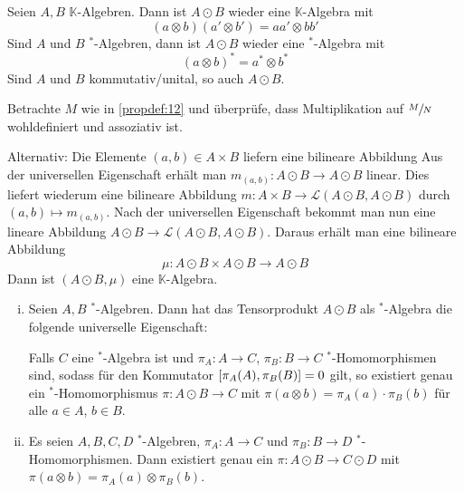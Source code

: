 \begin{proposition}[{name=[Tensorprodukt von Algebren]}]
	Seien $A,B$ $\mathbb{K}$-Algebren.
	Dann ist $A \odot B$ wieder eine $\mathbb{K}$-Algebra mit 
	\[
		(a \otimes b) (a' \otimes b') = aa' \otimes bb'
	\]
	Sind $A$ und $B$ $^*$-Algebren, dann ist $A \odot B$ wieder eine $^*$-Algebra mit 
	\[
		(a \otimes b)^* = a^* \otimes b^*
	\]
	Sind $A$ und $B$ kommutativ/unital, so auch $A \odot B$.
\end{proposition}
\begin{beweis}
	Betrachte $M$ wie in \autoref{propdef:12} und überprüfe, dass Multiplikation auf $\sfrac{M}{N}$ wohldefiniert und assoziativ ist.
	
	Alternativ: Die Elemente $(a,b) \in A \times B$ liefern eine bilineare Abbildung
	Aus der universellen Eigenschaft erhält man $m_{(a,b)} \colon A \odot B \to A \odot B$ linear.
	Dies liefert wiederum eine bilineare Abbildung $m \colon A \times B \to \mathcal{L}(A \odot B, A \odot B)$ durch $(a,b) \mapsto m_{(a,b)}$.
	Nach der universellen Eigenschaft bekommt man nun eine lineare Abbildung $A \odot B \to \mathcal{L}(A \odot B, A\odot B)$.
	Daraus erhält man eine bilineare Abbildung
	\[
		\mu \colon A \odot B \times A \odot B \longrightarrow A \odot B
	\]
	Dann ist $(A \odot B,\mu)$ eine $\mathbb{K}$-Algebra.
\end{beweis}

\begin{bemerkung}[label=bem:14,{name=[{universelle Eigenschaft des Tensorproduktes von *-Algebren}]}]
	\begin{enumerate}[(i)]
		\item Seien $A,B$ $^*$-Algebren.
		Dann hat das Tensorprodukt $A \odot B$ als $^*$-Algebra die folgende universelle Eigenschaft:
		
		Falls $C$ eine $^*$-Algebra ist und $\pi_A \colon A \to C$, $\pi_B \colon B \to C$ $^*$-Homomorphismen sind, sodass für den Kommutator $\benbrace*{\pi_A(A), \pi_B(B)}=0$ gilt, so existiert genau ein $^*$-Homomorphismus $\pi \colon A \odot B \to C$ mit $\pi(a \otimes b)= \pi_A(a) \cdot \pi_B(b)$ für alle $a \in A$, $b \in B$.
		\item Es seien $A,B,C,D$ $^*$-Algebren, $\pi_A \colon A \to C$ und $\pi_B \colon B \to D$ $^*$-Homomorphismen.
		Dann existiert genau ein $\pi \colon A \odot B \to C \odot D$ mit $\pi(a \otimes b)= \pi_A(a) \otimes \pi_B(b)$.
	\end{enumerate}
\end{bemerkung}

